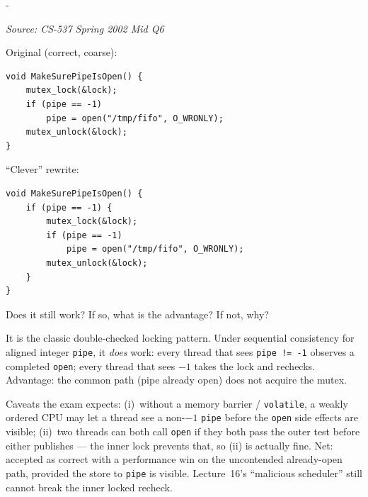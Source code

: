 \documentclass[11pt,a4paper]{article}
\makeatletter
\newcommand{\keepspace}[1]{\par\penalty-100\begingroup
  \setlength{\dimen@}{#1}\dimen@ii\pagegoal\advance\dimen@ii-\pagetotal
  \ifdim\dimen@>\dimen@ii\ifdim\dimen@ii>\z@\vfil\fi\break\fi\endgroup}
\newcounter{qn}[section]
\newenvironment{Qn}[4]{%
  \refstepcounter{qn}\keepspace{7\baselineskip}%
  \begin{tcolorbox}[qboxstyle, title={Q\thesection.\theqn\ \ [#1 \textbar\ #2]\ \ #4}]%
  {\footnotesize\color{g3}\textit{Source: #3}}\par\smallskip%
}{%
  \end{tcolorbox}%
}
\newenvironment{Sol}{%
  \begin{tcolorbox}[sboxstyle, title={Solution}]%
}{%
  \end{tcolorbox}\vspace{0.35em}%
}
\makeatother
\begin{document}
\begin{Qn}{Medium-Hard}{Lect 16--17}{CS-537 Spring 2002 Mid Q6}{Double-checked locking to open a pipe}
Original (correct, coarse):

\begin{lstlisting}[numbers=none]
void MakeSurePipeIsOpen() {
    mutex_lock(&lock);
    if (pipe == -1)
        pipe = open("/tmp/fifo", O_WRONLY);
    mutex_unlock(&lock);
}
\end{lstlisting}

``Clever'' rewrite:

\begin{lstlisting}[numbers=none]
void MakeSurePipeIsOpen() {
    if (pipe == -1) {
        mutex_lock(&lock);
        if (pipe == -1)
            pipe = open("/tmp/fifo", O_WRONLY);
        mutex_unlock(&lock);
    }
}
\end{lstlisting}

Does it still work? If so, what is the advantage? If not, why?
\end{Qn}
\begin{Sol}
It is the classic double-checked locking pattern. Under sequential consistency for aligned integer \texttt{pipe}, it \emph{does} work: every thread that sees \texttt{pipe != -1} observes a completed \texttt{open}; every thread that sees $-1$ takes the lock and rechecks. Advantage: the common path (pipe already open) does not acquire the mutex.

Caveats the exam expects: (i)~without a memory barrier / \texttt{volatile}, a weakly ordered CPU may let a thread see a non-$-1$ \texttt{pipe} before the \texttt{open} side effects are visible; (ii)~two threads can both call \texttt{open} if they both pass the outer test before either publishes --- the inner lock prevents that, so (ii) is actually fine. Net: accepted as correct with a performance win on the uncontended already-open path, provided the store to \texttt{pipe} is visible. Lecture~16's ``malicious scheduler'' still cannot break the inner locked recheck.
\end{Sol}
\end{document}

